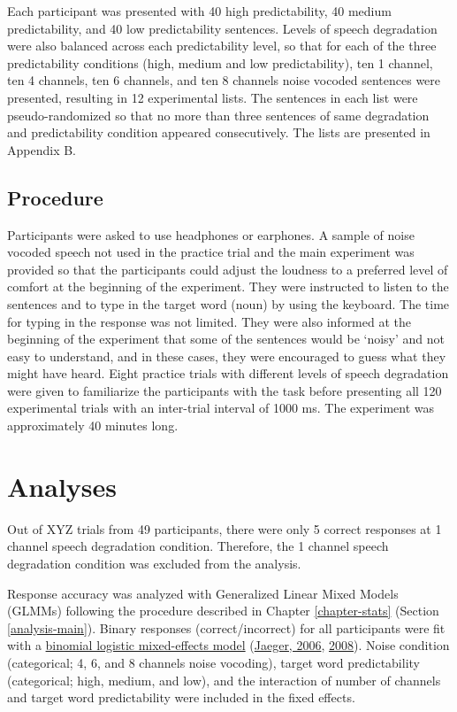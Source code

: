 \documentclass[a4paper, nobind]{templates/ociamthesis}
\begin{document}
Each participant was presented with 40 high predictability, 40 medium predictability, and 40 low predictability sentences.
Levels of speech degradation were also balanced across each predictability level, so that for each of the three predictability conditions (high, medium and low predictability), ten 1 channel, ten 4 channels, ten 6 channels, and ten 8 channels noise vocoded sentences were presented, resulting in 12 experimental lists.
The sentences in each list were pseudo-randomized so that no more than three sentences of same degradation and predictability condition appeared consecutively.
The lists are presented in Appendix B.

\hypertarget{procedure}{%
\subsection{Procedure}\label{procedure}}

Participants were asked to use headphones or earphones.
A sample of noise vocoded speech not used in the practice trial and the main experiment was provided so that the participants could adjust the loudness to a preferred level of comfort at the beginning of the experiment.
They were instructed to listen to the sentences and to type in the target word (noun) by using the keyboard.
The time for typing in the response was not limited.
They were also informed at the beginning of the experiment that some of the sentences would be `noisy' and not easy to understand, and in these cases, they were encouraged to guess what they might have heard.
Eight practice trials with different levels of speech degradation were given to familiarize the participants with the task before presenting all 120 experimental trials with an inter-trial interval of 1000 ms.
The experiment was approximately 40 minutes long.

\hypertarget{analyses}{%
\section{Analyses}\label{analyses}}

Out of XYZ trials from 49 participants, there were only 5 correct responses at 1 channel speech degradation condition.
Therefore, the 1 channel speech degradation condition was excluded from the analysis.

Response accuracy was analyzed with Generalized Linear Mixed Models (GLMMs) following the procedure described in Chapter \ref{chapter-stats} (Section \ref{analysis-main}).
Binary responses (correct/incorrect) for all participants were fit with a \protect\hyperlink{binomial-logistic-mixed-effects-model}{binomial logistic mixed-effects model} (\protect\hyperlink{ref-Jaeger2006}{Jaeger, 2006}, \protect\hyperlink{ref-Jaeger2008}{2008}).
Noise condition (categorical; 4, 6, and 8 channels noise vocoding), target word predictability (categorical; high, medium, and low), and the interaction of number of channels and target word predictability were included in the fixed effects.
\end{document}
